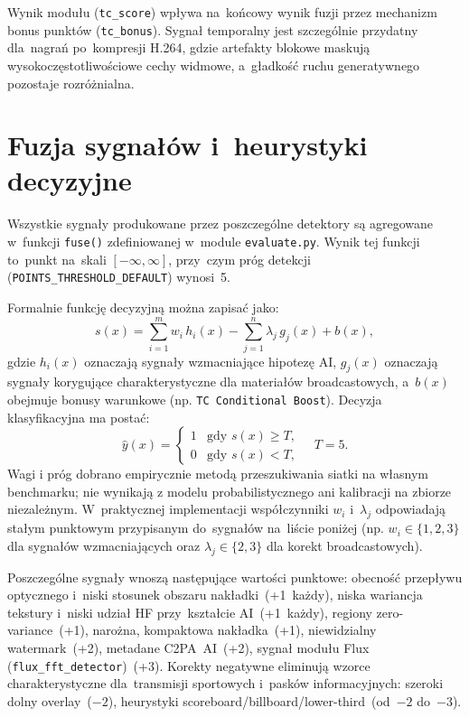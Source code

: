 Wynik modułu (\texttt{tc\_score}) wpływa na~końcowy wynik fuzji
przez mechanizm bonus punktów (\texttt{tc\_bonus}). Sygnał temporalny
jest szczególnie przydatny dla~nagrań po~kompresji H.264,
gdzie artefakty blokowe maskują wysokoczęstotliwościowe cechy widmowe,
a~gładkość ruchu generatywnego pozostaje rozróżnialna.

\section{Fuzja sygnałów i~heurystyki decyzyjne}

Wszystkie sygnały produkowane przez poszczególne detektory są agregowane
w~funkcji \texttt{fuse()} zdefiniowanej w~module \texttt{evaluate.py}.
Wynik tej funkcji to~punkt na~skali $[-\infty, \infty]$, przy~czym
próg detekcji (\texttt{POINTS\_THRESHOLD\_DEFAULT}) wynosi~5.

Formalnie funkcję decyzyjną można zapisać jako:
\[
s(x) = \sum_{i=1}^{m} w_i\,h_i(x) - \sum_{j=1}^{n} \lambda_j\,g_j(x) + b(x),
\]
gdzie $h_i(x)$ oznaczają sygnały wzmacniające hipotezę AI,
$g_j(x)$ oznaczają sygnały korygujące charakterystyczne dla materiałów
broadcastowych, a~$b(x)$ obejmuje bonusy warunkowe (np. \texttt{TC Conditional Boost}).
Decyzja klasyfikacyjna ma postać:
\[
\hat{y}(x)=\begin{cases}
1 & \text{gdy } s(x) \geq T,\\
0 & \text{gdy } s(x) < T,
\end{cases}
\quad T=5.
\]
Wagi i próg dobrano empirycznie metodą przeszukiwania siatki na własnym
benchmarku; nie wynikają z modelu probabilistycznego ani kalibracji na zbiorze
niezależnym.
W~praktycznej implementacji współczynniki $w_i$ i~$\lambda_j$ odpowiadają
stałym punktowym przypisanym do~sygnałów na~liście poniżej
(np. $w_i \in \{1,2,3\}$ dla sygnałów wzmacniających oraz
$\lambda_j \in \{2,3\}$ dla korekt broadcastowych).

Poszczególne sygnały wnoszą następujące wartości punktowe:
obecność przepływu optycznego i~niski stosunek obszaru nakładki~(+1~każdy),
niska wariancja tekstury i~niski udział HF przy~kształcie AI~(+1~każdy),
regiony zero-variance~(+1), narożna, kompaktowa nakładka~(+1),
niewidzialny watermark~(+2), metadane C2PA~AI~(+2), sygnał modułu Flux
(\texttt{flux\_fft\_detector})~(+3).
Korekty negatywne eliminują wzorce charakterystyczne dla~transmisji sportowych
i~pasków informacyjnych: szeroki dolny overlay~($-2$), heurystyki
scoreboard/billboard/lower-third~(od~$-2$ do~$-3$).

